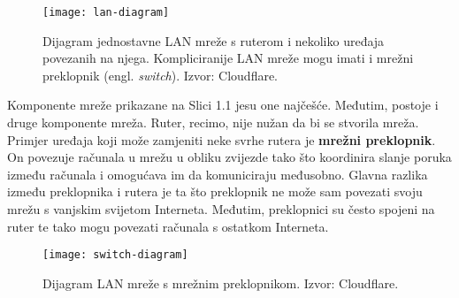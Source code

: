 
\begin{figure}[H]\label{fig:lan-diagram}
\centering
\vspace*{-1cm}
\texttt{[image: lan-diagram]}
\vspace*{-1cm}
\caption{Dijagram jednostavne LAN mreže s ruterom i nekoliko uređaja povezanih na njega. Kompliciranije LAN mreže mogu imati i mrežni preklopnik (engl. \textit{switch}). Izvor: Cloudflare.}
\end{figure}

Komponente mreže prikazane na Slici 1.1 jesu one najčešće.
Međutim, postoje i druge komponente mreža.
Ruter, recimo, nije nužan da bi se stvorila mreža.
Primjer uređaja koji može zamjeniti neke svrhe rutera je \textbf{mrežni preklopnik}.
On povezuje računala u mrežu u obliku zvijezde tako što koordinira slanje poruka između računala i omogućava im da komuniciraju međusobno.
Glavna razlika između preklopnika i rutera je ta što preklopnik ne može sam povezati svoju mrežu s vanjskim svijetom Interneta.
Međutim, preklopnici su često spojeni na ruter te tako mogu povezati računala s ostatkom Interneta.


\begin{figure}[H]\label{fig:switch-lan-diagram}
\texttt{[image: switch-diagram]}
\raggedleft
\caption{Dijagram LAN mreže s mrežnim preklopnikom. Izvor: Cloudflare.}
\end{figure}